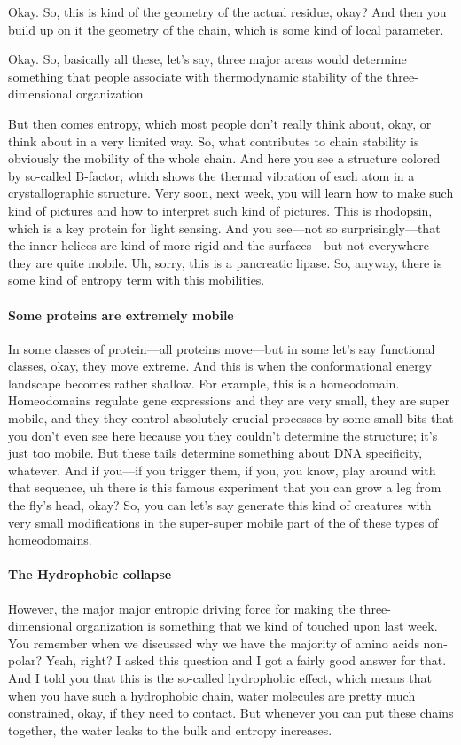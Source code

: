 Okay. So, this is kind of the geometry of the actual residue, okay? And then you build up on it the geometry of the chain, which is some kind of local parameter.

Okay. So, basically all these, let’s say, three major areas would determine something that people associate with thermodynamic stability of the three-dimensional organization.


But then comes entropy, which most people don't really think about, okay, or think about in a very limited way. So, what contributes to chain stability is obviously the mobility of the whole chain. And here you see a structure colored by so-called B-factor, which shows the thermal vibration of each atom in a crystallographic structure. Very soon, next week, you will learn how to make such kind of pictures and how to interpret such kind of pictures. This is rhodopsin, which is a key protein for light sensing. And you see—not so surprisingly—that the inner helices are kind of more rigid and the surfaces—but not everywhere—they are quite mobile. Uh, sorry, this is a pancreatic lipase. So, anyway, there is some kind of entropy term with this mobilities.

\paragraph{Some proteins are extremely mobile}
In some classes of protein—all proteins move—but in some let's say functional classes, okay, they move extreme. And this is when the conformational energy landscape becomes rather shallow. For example, this is a homeodomain. Homeodomains regulate gene expressions and they are very small, they are super mobile, and they they control absolutely crucial processes by some small bits that you don't even see here because you they couldn't determine the structure; it’s just too mobile. But these tails determine something about DNA specificity, whatever. And if you—if you trigger them, if you, you know, play around with that sequence, uh there is this famous experiment that you can grow a leg from the fly's head, okay? So, you can let's say generate this kind of creatures with very small modifications in the super-super mobile part of the of these types of homeodomains.

\paragraph{The Hydrophobic collapse}

However, the major major entropic driving force for making the three-dimensional organization is something that we kind of touched upon last week. You remember when we discussed why we have the majority of amino acids non-polar? Yeah, right? I asked this question and I got a fairly good answer for that. And I told you that this is the so-called hydrophobic effect, which means that when you have such a hydrophobic chain, water molecules are pretty much constrained, okay, if they need to contact. But whenever you can put these chains together, the water leaks to the bulk and entropy increases.

